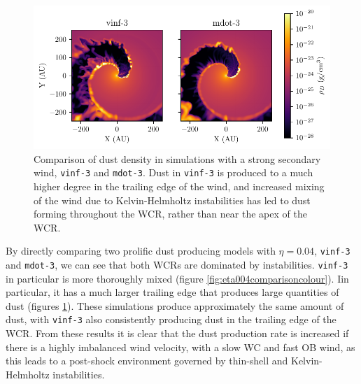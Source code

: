 \documentclass[fleqn,usenatbib]{mnras}
\begin{document}
\begin{figure}
  \centering
  \includegraphics[width=\linewidth]{assets/results/mixed/eta-004-comparison-rhod.pdf}
  \caption[]{Comparison of dust density in simulations with a strong secondary wind, \texttt{vinf-3} and \texttt{mdot-3}. Dust in \texttt{vinf-3} is produced to a much higher degree in the trailing edge of the wind, and increased mixing of the wind due to Kelvin-Helmholtz instabilities has led to dust forming throughout the WCR, rather than near the apex of the WCR.}
  \label{fig:eta004comparisonrhod}
\end{figure}

By directly comparing two prolific dust producing models with $\eta = 0.04$, \texttt{vinf-3} and \texttt{mdot-3}, we can see that both WCRs are dominated by instabilities.
\texttt{vinf-3} in particular is more thoroughly mixed (figure \ref{fig:eta004comparisoncolour}).
Iin particular, it has a much larger trailing edge that produces large quantities of dust (figures \ref{fig:eta004comparisonrhod}).
These simulations produce approximately the same amount of dust, with \texttt{vinf-3} also consistently producing dust in the trailing edge of the WCR.
From these results it is clear that the dust production rate is increased if there is a highly imbalanced wind velocity, with a slow WC and fast OB wind, as this leads to a post-shock environment governed by thin-shell and Kelvin-Helmholtz instabilities.


\end{document}
